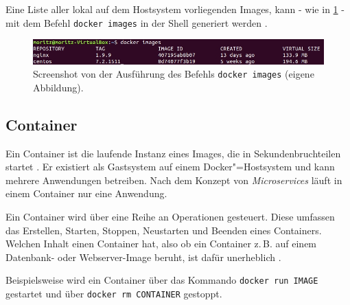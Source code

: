 \documentclass[../main.tex]{subfiles}
\begin{document}
			Eine Liste aller lokal auf dem Hostsystem vorliegenden Images, kann - wie in \fig \ref{fig:intro_dockerImages} - mit dem Befehl \texttt{docker images} in der Shell generiert werden \cite{dockerImages}.

			\begin{figure}[!htbp]
          \centering
          \includegraphics[width=1.0\textwidth]{./images/intro_dockerImages.jpg}
          \caption{Screenshot von der Ausführung des Befehls \texttt{docker images} (eigene Abbildung).}
          \label{fig:intro_dockerImages}
      \end{figure}



    \subsection{Container}
		\label{dockerContainer}
			Ein Container ist die laufende Instanz eines Images, die in Sekundenbruchteilen startet \cite[S.1]{dockerIntroIEEE}. Er existiert als Gastsystem auf einem Docker"=Hostsystem und kann mehrere Anwendungen betreiben. Nach dem Konzept von \emph{Microservices} läuft in einem Container nur eine Anwendung.

      Ein Container wird über eine Reihe an Operationen gesteuert. Diese umfassen das Erstellen, Starten, Stoppen, Neustarten und Beenden eines Containers. Welchen Inhalt einen Container hat, also ob ein Container z.\,B. auf einem Datenbank- oder Webserver-Image beruht, ist dafür unerheblich \cite[S.12]{dockerBook}\cite[S.2]{dockerLXCKub}.

			Beispielsweise wird ein Container über das Kommando \texttt{docker run IMAGE} gestartet und über \texttt{docker rm CONTAINER} gestoppt.
\end{document}
